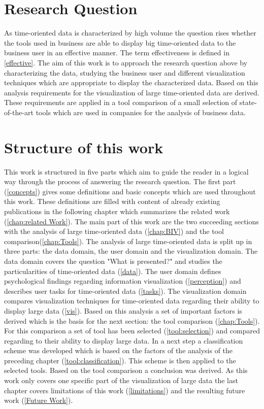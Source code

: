 \section{Research Question}
As time-oriented data is characterized by high volume the question rises whether the tools used in business are able to display big time-oriented data to the business user in an effective manner. The term effectiveness is defined in \ref{effective}. The aim of this work is to approach the research question above by characterizing the data, studying the business user and different visualization techniques which are appropriate to display the characterized data. Based on this analysis requirements for the visualization of large time-oriented data are derived. These requirements are applied in a tool comparison of a small selection of state-of-the-art tools which are used in companies for the analysis of business data.


\section{Structure of this work}
This work is structured in five parts which aim to guide the reader in a logical way through the process of answering the research question. The first part (\ref{concepts}) gives some definitions and basic concepts which are used throughout this work. These definitions are filled with content of already existing publications in the following chapter which summarizes the related work (\ref{chap:related Work}). The main part of this work are the two succeeding sections with the analysis of large time-oriented data (\ref{chap:BIV}) and the tool comparison(\ref{chap:Tools}). The analysis of large time-oriented data is split up in three parts: the data domain, the user domain and the visualization domain. The data domain covers the question "What is presented?" and studies the particularities of time-oriented data (\ref{data}). The user domain defines psychological findings regarding information visualization  (\ref{perception}) and describes user tasks for time-oriented data (\ref{tasks}). The visualization domain compares visualization techniques for time-oriented data regarding their ability to display large data (\ref{vis}). Based on this analysis a set of important factors is derived which is the basis for the next section: the tool comparison (\ref{chap:Tools}). For this comparison a set of tool has been selected (\ref{tool:selection}) and compared regarding to their ability to display large data. In a next step a  classification scheme was developed which is based on the factors of the analysis of the preceding chapter (\ref{tool:classification}). This scheme is then applied to the selected tools.
Based on the tool comparison a conclusion was derived.
As this work only covers one specific part of the visualization of large data the last chapter covers limitations of this work (\ref{limitations}) and the resulting future work (\ref{Future Work}).
